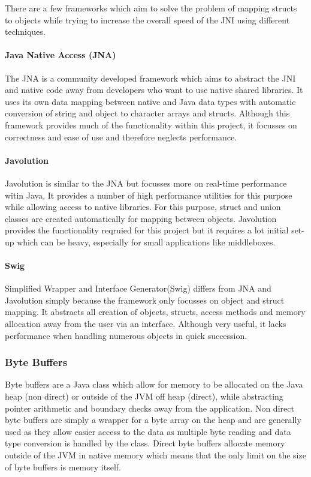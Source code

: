 \documentclass[final_report.tex]{subfiles}
\begin{document}
There are a few frameworks which aim to solve the problem of mapping structs to objects while trying to increase the overall speed of the JNI using different techniques.

\paragraph*{Java Native Access (JNA)}
The JNA is a community developed framework which aims to abstract the JNI and native code away from developers who want to use native shared libraries. It uses its own data mapping between native and Java data types with automatic conversion of string and object to character arrays and structs. Although this framework provides much of the functionality within this project, it focusses on correctness and ease of use and therefore neglects performance.

\paragraph*{Javolution}
Javolution is similar to the JNA but focusses more on real-time performance witin Java. It provides a number of high performance utilities for this purpose while allowing access to native libraries. For this purpose, struct and union classes are created automatically for mapping between objects. Javolution provides the functionality reqruied for this project but it requires a lot initial set-up which can be heavy, especially for small applications like middleboxes.

\paragraph*{Swig}
Simplified Wrapper and Interface Generator(Swig) differs from JNA and Javolution simply because the framework only focusses on object and struct mapping. It abstracts all creation of objects, structs, access methods and memory allocation away from the user via an interface. Although very useful, it lacks performance when handling numerous objects in quick succession. 

\subsubsection{Byte Buffers}
Byte buffers are a Java class which allow for memory to be allocated on the Java heap (non direct) or outside of the JVM off heap (direct), while abstracting pointer arithmetic and boundary checks away from the application. Non direct byte buffers are simply a wrapper for a byte array on the heap and are generally used as they allow easier access to the data as multiple byte reading and data type conversion is handled by the class. Direct byte buffers allocate memory outside of the JVM in native memory which means that the only limit on the size of byte buffers is memory itself.
\end{document}
